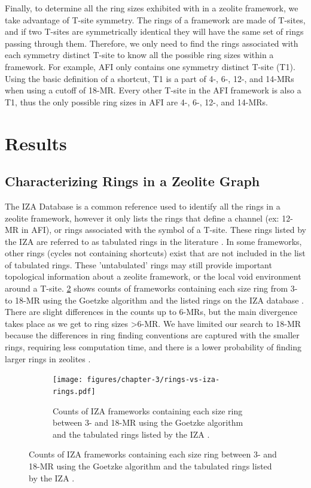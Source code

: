 \documentclass[preprint,numrefs,noinfo,sort&compress]{elsarticle}
\begin{document}
Finally, to determine all the ring sizes exhibited with in a zeolite framework, we take advantage of T-site symmetry. The rings of a framework are made of T-sites, and if two T-sites are symmetrically identical they will have the same set of rings passing through them. Therefore, we only need to find the rings associated with each symmetry distinct T-site to know all the possible ring sizes within a framework. For example, AFI only contains one symmetry distinct T-site (T1). Using the basic definition of a shortcut, T1 is a part of 4-, 6-, 12-, and 14-MRs when using a cutoff of 18-MR. Every other T-site in the AFI framework is also a T1, thus the only possible ring sizes in AFI are 4-, 6-, 12-, and 14-MRs.

\section{Results}
\label{sec:org47268f3}
\subsection{Characterizing Rings in a Zeolite Graph}
\label{sec:orgdbc479c}
The IZA Database \cite{baerlocher-database-nodate} is a common reference used to identify all the rings in a zeolite framework, however it only lists the rings that define a channel (ex: 12-MR in AFI), or rings associated with the symbol of a T-site. These rings listed by the IZA are referred to as tabulated rings in the literature \cite{curtis-statistical-2003}. In some frameworks, other rings (cycles not containing shortcuts) exist that are not included in the list of tabulated rings. These 'untabulated' rings may still provide important topological information about a zeolite framework, or the local void environment around a T-site. \cref{fig:fw-counts} shows counts of frameworks containing each size ring from 3- to 18-MR using the Goetzke algorithm and the listed rings on the IZA database \cite{baerlocher-database-nodate}. There are slight differences in the counts up to 6-MRs, but the main divergence takes place as we get to ring sizes \textgreater6-MR. We have limited our search to 18-MR because the differences in ring finding conventions are captured with the smaller rings, requiring less computation time, and there is a lower probability of finding larger rings in zeolites \cite{li-why-2014}.

\begin{figure}
\begin{figure}[H]
\centering
\texttt{[image: figures/chapter-3/rings-vs-iza-rings.pdf]}
\caption{Counts of IZA frameworks containing each size ring between 3- and 18-MR using the Goetzke algorithm and the tabulated rings listed by the IZA \cite{baerlocher-database-nodate}. \label{fig:fw-counts}}
\end{figure}
\end{figure}
\end{document}
